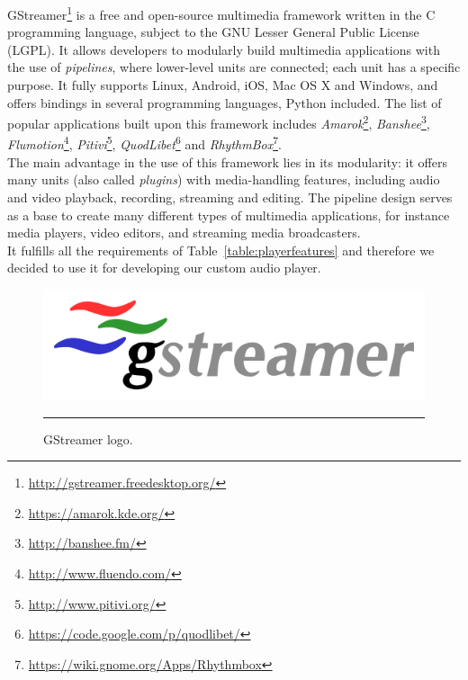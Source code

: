 GStreamer\footnote{\url{http://gstreamer.freedesktop.org/}} is a free and open-source multimedia framework written in the C programming language, subject to the GNU Lesser General Public License (LGPL). It allows developers to modularly build multimedia applications with the use of \textit{pipelines}, where lower-level units are connected; each unit has a specific purpose. It fully supports Linux, Android, iOS, Mac OS X and Windows, and offers bindings in several programming languages, Python included. The list of popular applications built upon this framework includes \textit{Amarok}\footnote{\url{https://amarok.kde.org/}}, \textit{Banshee}\footnote{\url{http://banshee.fm/}}, \textit{Flumotion}\footnote{\url{http://www.fluendo.com/}}, \textit{Pitivi}\footnote{\url{http://www.pitivi.org/}}, \textit{QuodLibet}\footnote{\url{https://code.google.com/p/quodlibet/}} and \textit{RhythmBox}\footnote{\url{https://wiki.gnome.org/Apps/Rhythmbox}}. \\
The main advantage in the use of this framework lies in its modularity: it offers many units (also called \textit{plugins}) with media-handling features, including audio and video playback, recording, streaming and editing. The pipeline design serves as a base to create many different types of multimedia applications, for instance media players, video editors, and streaming media broadcasters. \\ It fulfills all the requirements of Table~\ref{table:playerfeatures} and therefore we decided to use it for developing our custom audio player.

\begin{figure}[h]
\begin{center}
\includegraphics[scale=0.5]{Figures/gstreamer.png}
    \rule{20em}{0.5pt}
  \caption[GStreamer]{GStreamer logo.}
  \label{fig:GStreamer}
\end{center}
\end{figure}

